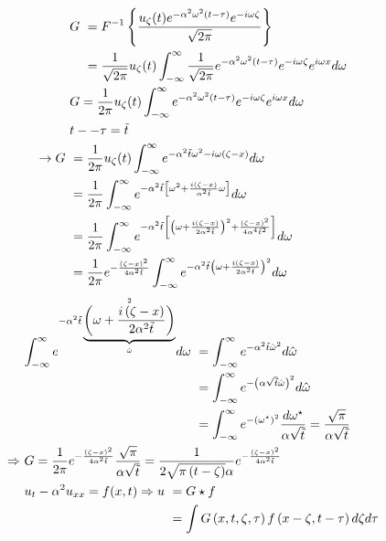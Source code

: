 \begin{equation*}
	\begin{aligned}
		&\
		\begin{aligned}
		G &\ =
		F^{-1}\left\{\frac{u_{\zeta}(t)e^{-\alpha^2\omega^2\left(t-\tau\right)}e^{-i\omega\zeta}}{\sqrt{2\pi}}\right\}
		\\ &\
		= \frac1{\sqrt{2\pi}}u_{\zeta}(t)\int_{-\infty}^\infty\frac1{\sqrt{2\pi}}e^{-\alpha^2\omega^2\left(t-\tau\right)}e^{-i\omega\zeta}e^{i\omega x}d\omega
		\end{aligned}
		\\ &\
		G=\frac1{2\pi}u_{\zeta}(t)\int_{-\infty}^\infty e^{-\alpha^2\omega^2\left(t-\tau\right)}e^{-i\omega\zeta}e^{i\omega x}d\omega
		\\ &\
		t--\tau=\tilde{t}
		\\
		\rightarrow G &\
		=\frac1{2\pi}u_{\zeta}(t)\int_{-\infty}^\infty e^{-\alpha^2\tilde{t}\omega^2-i\omega\left(\zeta-x\right)}d\omega
		\\ &\
		=\frac1{2\pi}\int_{-\infty}^\infty e^{-\alpha^2\tilde{t}\left[
			\omega^2+\frac{i\left(\zeta-x\right)}{\alpha^2\tilde{t}}\omega
			\right]}
		d\omega
		\\ &\
		= \frac1{2\pi}\int_{-\infty}^\infty e^{
			-\alpha^2\tilde{t}\left[
			\left(\omega+\frac{i\left(\zeta-x\right)}{2\alpha^2 \tilde{t}}\right)^2
			+
			\frac{\left(\zeta-x\right)^2}{4\alpha^4 \tilde{t}^2}
			\right]}d\omega
		\\ &\
		=\frac1{2\pi}e^{-\frac{\left(\zeta-x\right)^2}{4\alpha^2\tilde{t}}}\int_{-\infty}^\infty e^{-\alpha^2\tilde{t}\left(\omega+\frac{i\left(\zeta-x\right)}{2\alpha^2\tilde{t}}\right)^2}d\omega
	\end{aligned}
\end{equation*}
\begin{equation*}
	\begin{aligned}
	&\
	\begin{aligned}
		\int_{-\infty}^\infty e^{-\alpha^2\tilde{t}\underbrace{\left(\omega+\frac{i\left(\zeta-x\right)}{2\alpha^2\tilde{t}}\right)}_{\hat{\omega}}^2}d\omega &\ =
		\int_{-\infty}^\infty e^{-\alpha^2\tilde{t}\hat{\omega}^2}d\hat{\omega}
		\\ &\
		=\int_{-\infty}^\infty e^{-\left(\alpha\sqrt{\tilde{t}}\hat{\omega}\right)^2}d\hat{\omega}
		\\ &\
		=\int_{-\infty}^\infty e^{-\left(\omega^\star\right)^2}\frac{d\omega^\star}{\alpha\sqrt{\tilde{t}}}=\frac{\sqrt\pi}{\alpha\sqrt{\tilde{t}}}
	\end{aligned}
	\\ \Rightarrow &\
	G=\frac1{2\pi}e^{-\frac{\left(\zeta-x\right)^2}{4\alpha^2\tilde{t}}}\frac{\sqrt\pi}{\alpha\sqrt{\tilde t}}=\frac1{2\sqrt{\pi\left(t-\zeta\right)}\alpha}e^{-\frac{\left(\zeta-x\right)^2}{4\alpha^2\tilde{t}}}
	\\ &\
	\begin{aligned}
			u_t-\alpha^2u_{xx}=f(x,t)\Rightarrow u &\ = G\star f
			\\ &\
			= \int G\left(x,t,\zeta,\tau\right)f\left(x-\zeta,t-\tau\right)d\zeta d\tau
	\end{aligned}
	\end{aligned}
\end{equation*}
